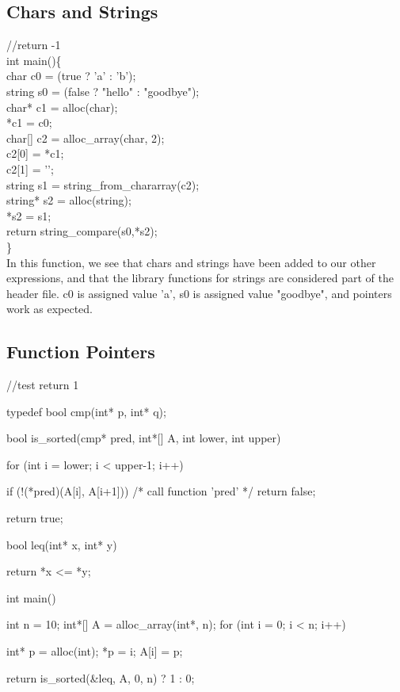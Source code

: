 \documentclass{article}
\begin{document}
\subsection{Chars and Strings}
//return -1\\
int main()\{\\
  char c0 = (true ? 'a' : 'b');\\
  string s0 = (false ? "hello" : "goodbye");\\
  char* c1 = alloc(char);\\
  *c1 = c0;\\
  char[] c2 = alloc\_array(char, 2);\\
  c2[0] = *c1;\\
  c2[1] = '\0';\\
  string s1 = string\_from\_chararray(c2);\\
  string* s2 = alloc(string);\\
  *s2 = s1;\\
  return string\_compare(s0,*s2);\\
\}\\

In this function, we see that chars and strings have been added to our other expressions, and that the library functions for strings are considered part of the header file. c0 is assigned value 'a', s0 is assigned value "goodbye", and pointers work as expected.

\subsection{Function Pointers}
//test return 1

typedef bool cmp(int* p, int* q);

bool is_sorted(cmp* pred, int*[] A, int lower, int upper)
{
  for (int i = lower; i < upper-1; i++) {
        if (!(*pred)(A[i], A[i+1])) /* call function ’pred’ */
            return false;
              
  }
    return true;

}

bool leq(int* x, int* y){
    return *x <= *y;

}

int main() {
    int n = 10;
      int*[] A = alloc_array(int*, n);
      for (int i = 0; i < n; i++) {
            int* p = alloc(int); *p = i;
                A[i] = p;
                  
      }
        return is_sorted(&leq, A, 0, n) ? 1 : 0;

}
\end{document}
